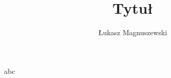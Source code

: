 \documentclass{article}
\title{Tytuł}
\author{Łukasz Magnuszewski}
\begin{document}
\maketitle
abc
\end{document}
